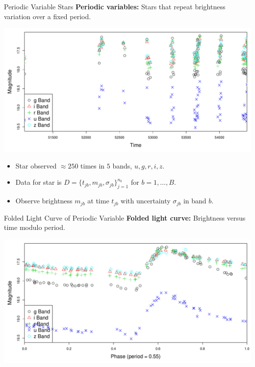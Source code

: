 \documentclass[12pt]{beamer}
\begin{document}
\begin{frame}{Periodic Variable Stars}
\textbf{Periodic variables:} Stars that repeat brightness variation over a fixed period.
\begin{center}
\includegraphics[scale=.3]{figs/unfolded_13350.pdf}
\end{center}
\begin{itemize}
\item Star observed $\approx 250$ times in $5$ bands, $u,g,r,i,z$.
\item Data for star is $D=\{t_{jb},m_{jb},\sigma_{jb}\}_{j=1}^{n_b}$ for $b=1,\ldots,B$.
\item Observe brightness $m_{jb}$ at time $t_{jb}$ with uncertainty $\sigma_{jb}$ in band $b$.
\end{itemize}
\end{frame}


\begin{frame}{Folded Light Curve of Periodic Variable}
\textbf{Folded light curve:} Brightness versus time modulo period.
\begin{center}
\includegraphics[scale=.3]{figs/folded_13350.pdf}
\end{center}
\end{frame}
\end{document}
